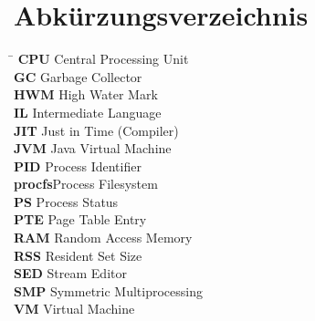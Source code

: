 \documentclass{fancydocument}
\begin{document}
\newpage

\section{Abk\"urzungsverzeichnis}
\begin{tabbing}
\hspace*{2cm}\=\kill
\textbf{CPU} \>Central Processing Unit\\
\textbf{GC} \>Garbage Collector\\
\textbf{HWM} \>High Water Mark\\
\textbf{IL} \>Intermediate Language\\
\textbf{JIT} \>Just in Time (Compiler)\\
\textbf{JVM} \>Java Virtual Machine\\
\textbf{PID} \>Process Identifier\\
\textbf{procfs}\>Process Filesystem\\
\textbf{PS} \>Process Status\\
\textbf{PTE} \>Page Table Entry\\
\textbf{RAM} \>Random Access Memory\\
\textbf{RSS} \>Resident Set Size\\
\textbf{SED} \>Stream Editor\\
\textbf{SMP} \>Symmetric Multiprocessing\\
\textbf{VM} \>Virtual Machine\\
\end{tabbing}
\end{document}
